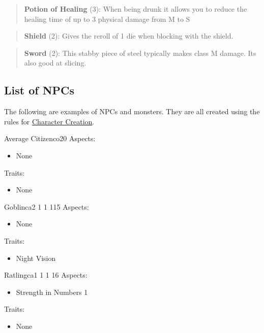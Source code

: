 \documentclass[11pt]{article}
\begin{document}
{\begin{quote}
\textbf{Potion of Healing} (3): When being drunk it allows you to reduce the healing time of up to 3 physical damage from M to S
\end{quote}

\begin{quote}
\textbf{Shield} (2): Gives the reroll of 1 die when blocking with the shield.
\end{quote}

\begin{quote}
\textbf{Sword} (2): This stabby piece of steel typically makes class M damage. Its also good at slicing.
\end{quote}


\subsection{List of NPCs}
\label{sec:org51d4da7}
The following are examples of NPCs and monsters. They are all created using the rules for \hyperref[sec:org810b613]{Character Creation}. 

\begin{npc}{Average Citizen}{co}{2}{0}
Aspects:
\begin{itemize}
\item None
\end{itemize}
Traits:
\begin{itemize}
\item None
\end{itemize}
\end{npc}

\begin{npc}{Goblin}{ca}{2 1 1 1}{15}
Aspects:
\begin{itemize}
\item None
\end{itemize}
Traits:
\begin{itemize}
\item Night Vision
\end{itemize}
\end{npc}

\begin{npc}{Ratling}{ca}{1 1 1 1}{6}
Aspects:
\begin{itemize}
\item Strength in Numbers 1
\end{itemize}
Traits:
\begin{itemize}
\item None
\end{itemize}
\end{npc}

}
\end{document}
